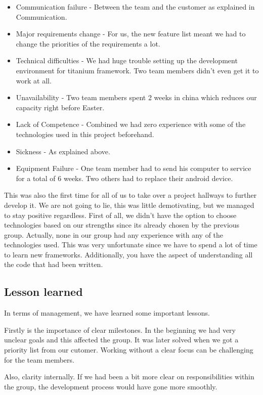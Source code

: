 \begin{itemize}
	\item Communication failure - Between the team and the customer as explained in Communication.
	\item Major requirements change - For us, the new feature list meant we had to change the priorities of the requirements a lot.
	\item Technical difficulties - We had huge trouble setting up the development environment for titanium framework. Two team members didn't even get it to work at all.
	\item Unavailability - Two team members spent 2 weeks in china which reduces our capacity right before Easter. 
	\item Lack of Competence - Combined we had zero experience with some of the technologies used in this project beforehand.
	\item Sickness - As explained above.
	\item Equipment Failure - One team member had to send his computer to service for a total of 6 weeks. Two others had to replace their android device. 
\end{itemize}

This was also the first time for all of us to take over a project hallways to further develop it. We are not going to lie, this was little demotivating, but we managed to stay positive regardless. First of all, we didn't have the option to choose technologies based on our strengths since its already chosen by the previous group. Actually, none in our group had any experience with any of the technologies used. This was very unfortunate since we have to spend a lot of time to learn new frameworks. Additionally, you have the aspect of understanding all the code that had been written. 

	\subsection{Lesson learned}

In terms of management, we have learned some important lessons.

Firstly is the importance of clear milestones. In the beginning we had very unclear goals and this affected the group. It was later solved when we got a priority list from our cutomer. Working without a clear focus can be challenging for the team members.

Also, clarity internally. If we had been a bit more clear on responsibilities within the group, the development process would have gone more smoothly.

